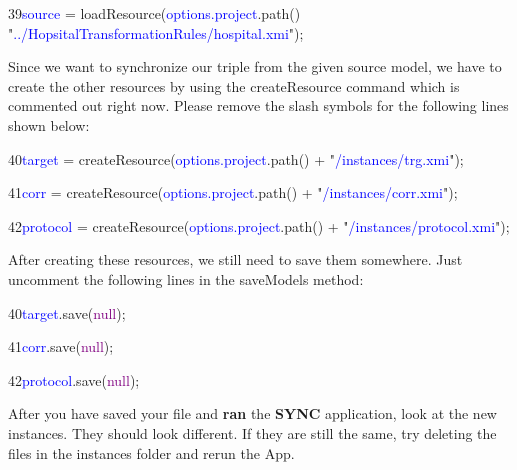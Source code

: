 {39\hspace{0.5cm}\textcolor{Blue}{source} = loadResource(\textcolor{Blue}{options.project}.path() "\textcolor{Blue}{../HopsitalTransformationRules/hospital.xmi}");\newline

\clearpage

Since we want to synchronize our triple from the given source model, we have to create the other resources by using the \textsf{createResource} command which is commented out right now. Please remove the slash symbols for the following lines shown below:\newline

{

40\hspace{0.5cm}\textcolor{Blue}{target} = createResource(\textcolor{Blue}{options.project}.path() + "\textcolor{Blue}{/instances/trg.xmi}");

41\hspace{0.5cm}\textcolor{Blue}{corr} = createResource(\textcolor{Blue}{options.project}.path() + "\textcolor{Blue}{/instances/corr.xmi}");

42\hspace{0.5cm}\textcolor{Blue}{protocol} = createResource(\textcolor{Blue}{options.project}.path() + "\textcolor{Blue}{/instances/protocol.xmi}");\newline

}

After creating these resources, we still need to save them somewhere. Just uncomment the following lines in the \textsf{saveModels} method:\newline

{

40\hspace{0.5cm}\textcolor{Blue}{target}.save(\textcolor{Purple}{null});

41\hspace{0.5cm}\textcolor{Blue}{corr}.save(\textcolor{Purple}{null});

42\hspace{0.5cm}\textcolor{Blue}{protocol}.save(\textcolor{Purple}{null}); \newline

}

After you have saved your file and \textbf{ran} the \textbf{SYNC} application, look at the new instances. They should look different. If they are still the same, try deleting the files in the instances folder and rerun the App.

}
